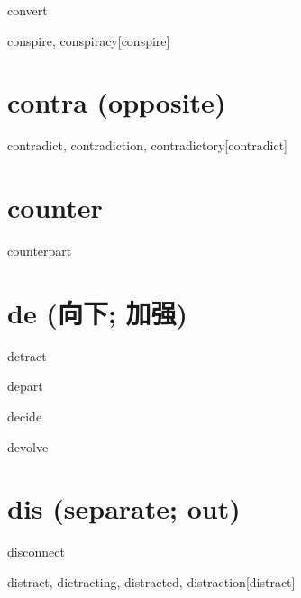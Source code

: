 \begin{wordRef}{convert}
\end{wordRef}

\begin{wordRef}{conspire, conspiracy}[conspire]
\end{wordRef}

\section{contra (opposite)}

\begin{wordRef}{contradict, contradiction, contradictory}[contradict]
\end{wordRef}

\section{counter}

\begin{wordRef}{counterpart}
\end{wordRef}

\section{de (向下; 加强)}

\begin{wordRef}{detract}
\end{wordRef}

\begin{wordRef}{depart}
\end{wordRef}

\begin{wordRef}{decide}
\end{wordRef}

\begin{wordRef}{devolve}
\end{wordRef}

\section{dis (separate; out)}

\begin{wordRef}{disconnect}
\end{wordRef}

\begin{wordRef}{distract, dictracting, distracted, distraction}[distract]
\end{wordRef}

